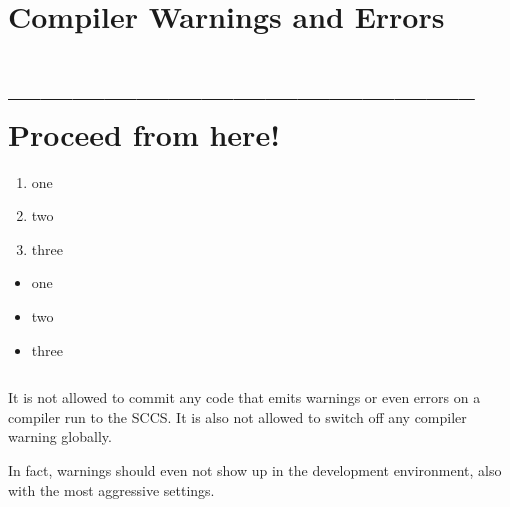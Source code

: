 \begin{lstlisting}[numbers=left]
\end{lstlisting}


\section{Compiler Warnings and Errors}\label{sec:CompilerWarningsAndErrors}
\hrulefill\newpage 
\section{-------------------------------------------- Proceed from here!}
\lipsum[1]

\begin{enumerate}[label=P\arabic*.]
\item{one}
\item{two}
\item{three}
\end{enumerate}

\begin{itemize}[nosep]
\item{one}
\item{two}
\item{three}
\end{itemize}

\begin{lstlisting}[numbers=left]
\end{lstlisting}



It is not allowed to commit any code that emits warnings or even errors on a compiler run to the SCCS. It is also not allowed to switch off any compiler warning globally.

In fact, warnings should even not show up in the development environment, also with the most aggressive settings.

